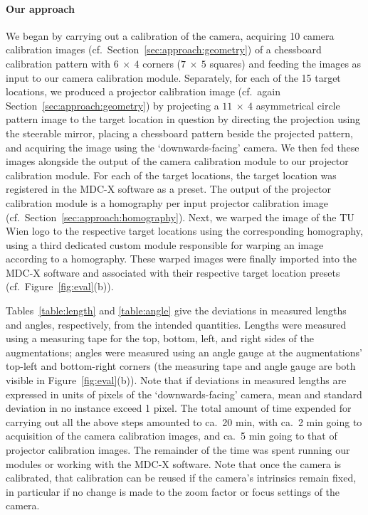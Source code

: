 \documentclass[review]{elsarticle}
\begin{document}
\paragraph{Our approach} We began by carrying out a calibration of the camera, acquiring 10 camera calibration images (cf.\ Section~\ref{sec:approach:geometry}) of a chessboard calibration pattern with $6~\times~4$ corners ($7~\times~5$ squares) and feeding the images as input to our camera calibration module. Separately, for each of the 15 target locations, we produced a projector calibration image (cf.\ again Section~\ref{sec:approach:geometry}) by projecting a $11~\times~4$ asymmetrical circle pattern image to the target location in question by directing the projection using the steerable mirror, placing a chessboard pattern beside the projected pattern, and acquiring the image using the `downwards-facing' camera. We then fed these images alongside the output of the camera calibration module to our projector calibration module. For each of the target locations, the target location was registered in the MDC-X software as a preset. The output of the projector calibration module is a homography per input projector calibration image (cf.\ Section~\ref{sec:approach:homography}). Next, we warped the image of the TU Wien logo to the respective target locations using the corresponding homography, using a third dedicated custom module responsible for warping an image according to a homography. These warped images were finally imported into the MDC-X software and associated with their respective target location presets (cf.\ Figure~\ref{fig:eval}(b)).

Tables~\ref{table:length} and \ref{table:angle} give the deviations in measured lengths and angles, respectively, from the intended quantities. Lengths were measured using a measuring tape for the top, bottom, left, and right sides of the augmentations; angles were measured using an angle gauge at the augmentations' top-left and bottom-right corners (the measuring tape and angle gauge are both visible in Figure~\ref{fig:eval}(b)). Note that if deviations in measured lengths are expressed in units of pixels of the `downwards-facing' camera, mean and standard deviation in no instance exceed 1 pixel. The total amount of time expended for carrying out all the above steps amounted to ca.\ 20 min, with ca.\ 2 min going to acquisition of the camera calibration images, and ca.\ 5 min going to that of projector calibration images. The remainder of the time was spent running our modules or working with the MDC-X software. Note that once the camera is calibrated, that calibration can be reused if the camera's intrinsics remain fixed, in particular if no change is made to the zoom factor or focus settings of the camera.
\end{document}
